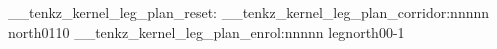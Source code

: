 \documentclass{standalone}
\begin{document}
\ExplSyntaxOn
\__tenkz_kernel_leg_plan_reset:
\__tenkz_kernel_leg_plan_corridor:nnnnn {north}{0}{1}{1}{0}
\__tenkz_kernel_leg_plan_enrol:nnnnn {leg}{north}{0}{0}{-1}
\ExplSyntaxOff
\end{document}
